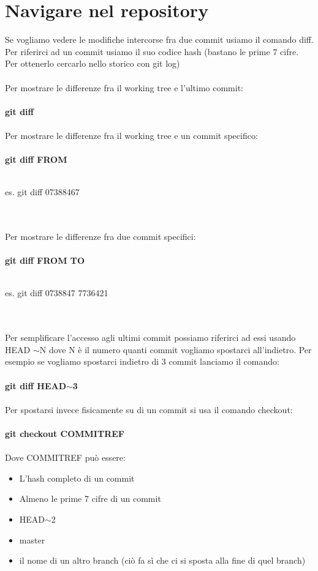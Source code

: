 \documentclass[a4paper,12pt]{report}
\begin{document}
\chapter{Navigare nel repository}
Se vogliamo vedere le modifiche intercorse fra due commit usiamo il comando diff. Per riferirci ad un commit usiamo il suo codice hash (bastano le prime 7 cifre. Per ottenerlo cercarlo nello storico con git log)
\\\\
Per mostrare le differenze fra il working tree e l'ultimo commit:
\\\\
\textbf{git diff}
\\\\
Per mostrare le differenze fra il working tree e un commit specifico:
\\\\
\textbf{git diff FROM}
\\\\
\centerline{es. git diff 07388467}
\\\\
Per mostrare le differenze fra due commit specifici:
\\\\
\textbf{git diff FROM TO}
\\\\
\centerline{es. git diff 0738847 7736421}
\\\\
Per semplificare l'accesso agli ultimi commit possiamo riferirci ad essi usando HEAD $\sim$N dove N è il numero quanti  commit vogliamo spostarci all'indietro. Per esempio se vogliamo spostarci indietro di 3 commit lanciamo il comando:
\\\\
\textbf{git diff HEAD$\sim$3}
\\\\
Per spostarsi invece fisicamente su di un commit si usa il comando checkout:
\\\\
\textbf{git checkout COMMITREF}
\\\\
Dove COMMITREF può essere:
\begin{itemize}
\item L'hash completo di un commit
\item Almeno le prime 7 cifre di un commit
\item HEAD$\sim$2
\item master
\item il nome di un altro branch (ciò fa sì che ci si sposta alla fine di quel branch)
\end{itemize}
\end{document}
